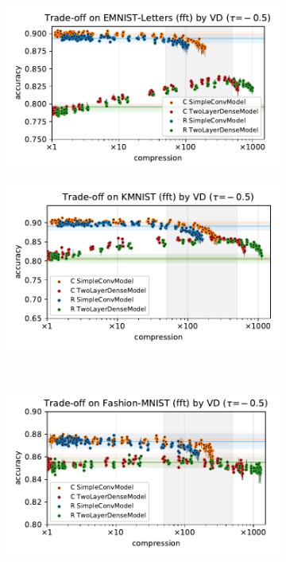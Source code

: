 \documentclass[a4paper]{extarticle}
\begin{document}
\begin{figure}[ht]
  \centering
  \begin{subfigure}[b]{0.5\textwidth}
    \centering
    \includegraphics[width=\linewidth]{../figure__mnist-like__trade-off/legacy__VD__emnist_letters__fft__-0.5.pdf}
  \end{subfigure}%
  \begin{subfigure}[b]{0.5\textwidth}
    \centering
    \includegraphics[width=\linewidth]{../figure__mnist-like__trade-off/legacy__VD__kmnist__fft__-0.5.pdf}
  \end{subfigure} \\%
  \begin{subfigure}[b]{0.5\textwidth}
    \centering
    \includegraphics[width=\linewidth]{../figure__mnist-like__trade-off/legacy__VD__fashionmnist__fft__-0.5.pdf}

\end{subfigure}
\end{figure}
\end{document}

